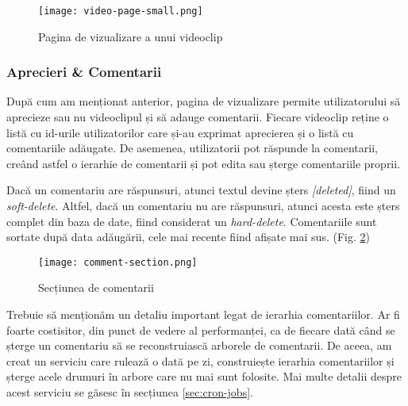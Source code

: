 \begin{figure}[h]
    \centering
    \texttt{[image: video-page-small.png]}
    \caption{Pagina de vizualizare a unui videoclip}
    \label{fig:video-page}
\end{figure}


\subsubsection{Aprecieri \& Comentarii}
După cum am menționat anterior, pagina de vizualizare permite utilizatorului să aprecieze
sau nu videoclipul și să adauge comentarii. Fiecare videoclip reține o listă cu id-urile
utilizatorilor care și-au exprimat aprecierea și o listă cu comentariile adăugate.
De asemenea, utilizatorii pot răspunde la comentarii, creând astfel o ierarhie de comentarii
și pot edita sau șterge comentariile proprii.
\par
Dacă un comentariu are răspunsuri, atunci textul devine șters \textit{[deleted]}, fiind un \textit{soft-delete}.
Altfel, dacă un comentariu nu are răspunsuri, atunci acesta este șters complet din baza de date,
fiind considerat un \textit{hard-delete}. Comentariile sunt sortate după data adăugării, cele mai
recente fiind afișate mai sus. (Fig. \ref{fig:comment-section})

\begin{figure}[h]
    \centering
    \texttt{[image: comment-section.png]}
    \caption{Secțiunea de comentarii}
    \label{fig:comment-section}
\end{figure}

Trebuie să menționăm un detaliu important legat de ierarhia comentariilor. Ar fi foarte costisitor,
din punct de vedere al performanței, ca de fiecare dată când se șterge un comentariu să se reconstruiască
arborele de comentarii. De aceea, am creat un serviciu care rulează o dată pe zi, construiește ierarhia
comentariilor și șterge acele drumuri în arbore care nu mai sunt folosite. Mai multe detalii despre
acest serviciu se găsesc în secțiunea \ref{sec:cron-jobs}.

